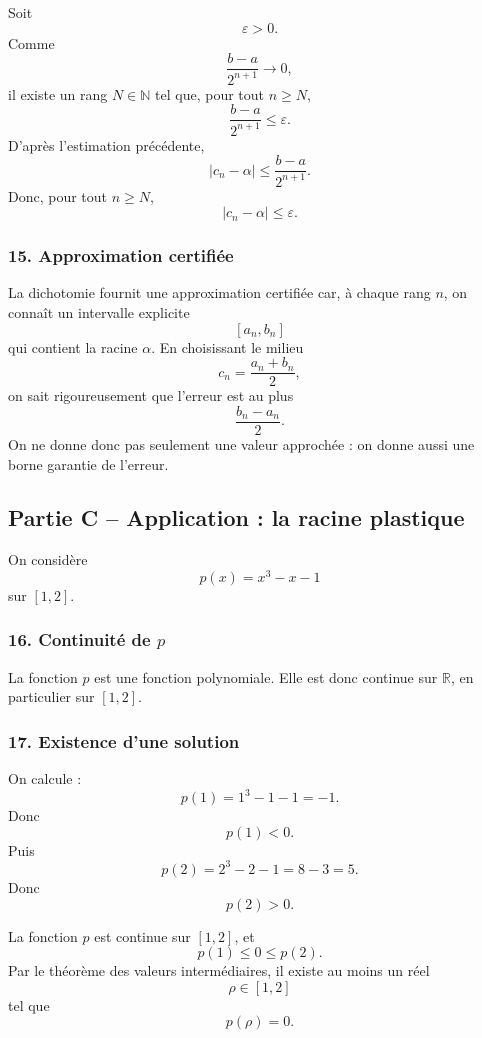 \documentclass[11pt,a4paper]{article}
\newcommand{\R}{\mathbb{R}}
\newcommand{\N}{\mathbb{N}}
\begin{document}
Soit
\[
\varepsilon>0.
\]
Comme
\[
\frac{b-a}{2^{n+1}}\to0,
\]
il existe un rang \(N\in\N\) tel que, pour tout \(n\geq N\),
\[
\frac{b-a}{2^{n+1}}\leq \varepsilon.
\]
D'après l'estimation précédente,
\[
|c_n-\alpha|\leq \frac{b-a}{2^{n+1}}.
\]
Donc, pour tout \(n\geq N\),
\[
|c_n-\alpha|\leq\varepsilon.
\]


\subsubsection*{15. Approximation certifiée}

La dichotomie fournit une approximation certifiée car, à chaque rang \(n\), on connaît un intervalle explicite
\[
[a_n,b_n]
\]
qui contient la racine \(\alpha\). En choisissant le milieu
\[
c_n=\frac{a_n+b_n}{2},
\]
on sait rigoureusement que l'erreur est au plus
\[
\frac{b_n-a_n}{2}.
\]
On ne donne donc pas seulement une valeur approchée : on donne aussi une borne garantie de l'erreur.


\subsection*{Partie C -- Application : la racine plastique}

On considère
\[
p(x)=x^3-x-1
\]
sur \([1,2]\).


\subsubsection*{16. Continuité de \(p\)}

La fonction \(p\) est une fonction polynomiale. Elle est donc continue sur \(\R\), en particulier sur \([1,2]\).


\subsubsection*{17. Existence d'une solution}

On calcule :
\[
p(1)=1^3-1-1=-1.
\]
Donc
\[
p(1)<0.
\]
Puis
\[
p(2)=2^3-2-1=8-3=5.
\]
Donc
\[
p(2)>0.
\]

La fonction \(p\) est continue sur \([1,2]\), et
\[
p(1)\leq0\leq p(2).
\]
Par le théorème des valeurs intermédiaires, il existe au moins un réel
\[
\rho\in[1,2]
\]
tel que
\[
p(\rho)=0.
\]
\end{document}
